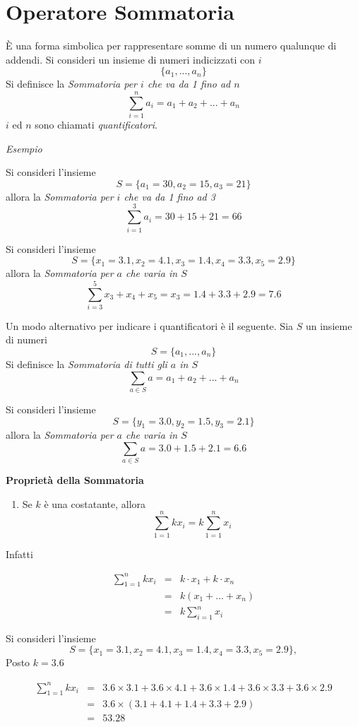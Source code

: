 \documentclass[
  11pt,
]{book}
\providecommand{\tightlist}{%
  \setlength{\itemsep}{0pt}\setlength{\parskip}{0pt}}
\theoremstyle{mytheoremstyle}
\theoremstyle{mydefstyle}
\begin{document}
\section{Operatore Sommatoria}\label{operatore-sommatoria}

È una forma simbolica per rappresentare somme di un numero qualunque di addendi.
Si consideri un insieme di numeri indicizzati con \(i\)
\[
\{a_1,...,a_n\}
\]
Si definisce la \emph{Sommatoria per \(i\) che va da 1 fino ad \(n\)}
\[
\sum_{i=1}^n a_i = a_1+a_2+...+a_n
\]
\(i\) ed \(n\) sono chiamati \emph{quantificatori}.

\emph{Esempio}

Si consideri l'insieme
\[
S=\{a_1=30,a_2=15,a_3=21\}
\]
allora la \emph{Sommatoria per \(i\) che va da 1 fino ad 3}
\[
\sum_{i=1}^3 a_i = 30+15+21=66
\]

Si consideri l'insieme
\[
S=\{x_1 = 3.1,x_2 = 4.1, x_3 = 1.4,x_4=3.3,x_5=2.9\}
\]
allora la \emph{Sommatoria per \(a\) che varia in \(S\)}
\[
\sum_{i=3}^5  x_3 + x_4+x_5=x_3 = 1.4+3.3+2.9=7.6
\]

Un modo alternativo per indicare i quantificatori è il seguente. Sia \(S\) un insieme di numeri
\[
S=\{a_1,...,a_n\}
\]
Si definisce la \emph{Sommatoria di tutti gli \(a\) in \(S\)}
\[
\sum_{a\in S} a = a_1+a_2+...+a_n
\]

Si consideri l'insieme
\[
S=\{y_1=3.0,y_2=1.5,y_3=2.1\}
\]
allora la \emph{Sommatoria per \(a\) che varia in \(S\)}
\[
\sum_{a\in S} a = 3.0+1.5+2.1=6.6
\]

\textbf{Proprietà della Sommatoria}

\begin{enumerate}
\def\labelenumi{\arabic{enumi}.}
\tightlist
\item
  Se \(k\) è una costatante, allora
  \[
  \sum_{1=1}^n k x_i = k\sum_{1=1}^n  x_i
  \]
\end{enumerate}

Infatti

\begin{eqnarray*}
\sum_{1=1}^n k x_i   &=&  k\cdot x_1 + k\cdot x_n\\
 &=& k(x_1+...+x_n)\\
 &=& k\sum_{i=1}^n x_i
\end{eqnarray*}

Si consideri l'insieme
\[
S=\{x_1 = 3.1,x_2 = 4.1, x_3 = 1.4,x_4=3.3,x_5=2.9\},
\]
Posto \(k=3.6\)

\begin{eqnarray*}
\sum_{1=1}^n k x_i   &=&  3.6\times 3.1+3.6\times 4.1+3.6\times 1.4+3.6\times 3.3+3.6\times 2.9\\
 &=& 3.6\times(3.1+4.1+1.4+3.3+2.9)\\
 &=& 53.28
\end{eqnarray*}
\end{document}
